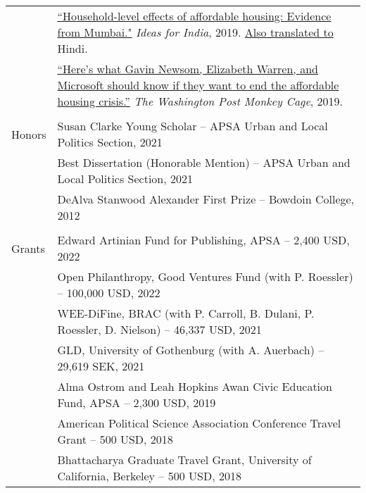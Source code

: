 \documentclass[letterpaper, 10pt]{article}
\begin{document}
\begin{longtable}{p{1.5in}p{5in}}
&\href{https://www.ideasforindia.in/topics/poverty-inequality/household-level-effects-of-affordable-housing-evidence-from-mumbai.html}{``Household-level effects of affordable housing: Evidence from Mumbai."} \textit{Ideas for India}, 2019.  \href{https://www.ideasforindia.in/topics/poverty-inequality/household-level-effects-of-affordable-housing-evidence-from-mumbai-hindi.html}{Also translated to} Hindi.\\



& \href{https://www.washingtonpost.com/news/monkey-cage/wp/2019/01/31/heres-what-gavin-newsom-elizabeth-warren-and-microsoft-should-know-if-want-to-end-the-affordable-housing-crisis/?tid=sm_tw_cage}{``Here's what Gavin Newsom, Elizabeth Warren, and Microsoft should know if they want to end the affordable housing crisis.''} \textit{The Washington Post Monkey Cage}, 2019.\\



&\\




{{Honors}} 
& Susan Clarke Young Scholar  -- APSA Urban and Local Politics Section, 2021\\

& Best Dissertation  (Honorable Mention) --  APSA Urban and Local Politics Section, 2021 \\
& DeAlva Stanwood Alexander First Prize  --  Bowdoin College, 2012 \\

& \\

{{Grants}} 
& Edward Artinian Fund for Publishing, APSA -- 2,400 USD, 2022\\
& Open Philanthropy, Good Ventures Fund (with P. Roessler) -- 100,000 USD, 2022\\
& WEE-DiFine, BRAC (with P. Carroll, B. Dulani, P. Roessler,  D. Nielson)
 -- 46,337 USD, 2021\\


& GLD, University of Gothenburg (with A. Auerbach)
-- 29,619 SEK, 2021 \\


& Alma Ostrom and Leah Hopkins Awan Civic Education Fund, APSA -- 2,300 USD, 2019\\

& American Political Science Association Conference Travel Grant -- 500 USD, 2018 \\
& Bhattacharya Graduate Travel Grant,  University of California, Berkeley -- 500 USD, 2018\\



\end{longtable}
\end{document}
